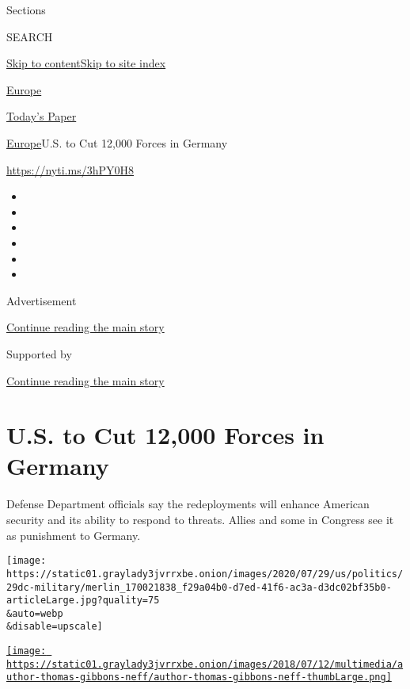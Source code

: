 Sections

SEARCH

\protect\hyperlink{site-content}{Skip to
content}\protect\hyperlink{site-index}{Skip to site index}

\href{https://www.nytimes3xbfgragh.onion/section/world/europe}{Europe}

\href{https://myaccount.nytimes3xbfgragh.onion/auth/login?response_type=cookie\&client_id=vi}{}

\href{https://www.nytimes3xbfgragh.onion/section/todayspaper}{Today's
Paper}

\href{/section/world/europe}{Europe}\textbar{}U.S. to Cut 12,000 Forces
in Germany

\url{https://nyti.ms/3hPY0H8}

\begin{itemize}
\item
\item
\item
\item
\item
\item
\end{itemize}

Advertisement

\protect\hyperlink{after-top}{Continue reading the main story}

Supported by

\protect\hyperlink{after-sponsor}{Continue reading the main story}

\hypertarget{us-to-cut-12000-forces-in-germany}{%
\section{U.S. to Cut 12,000 Forces in
Germany}\label{us-to-cut-12000-forces-in-germany}}

Defense Department officials say the redeployments will enhance American
security and its ability to respond to threats. Allies and some in
Congress see it as punishment to Germany.

\texttt{[image: https://static01.graylady3jvrrxbe.onion/images/2020/07/29/us/politics/29dc-military/merlin\_170021838\_f29a04b0-d7ed-41f6-ac3a-d3dc02bf35b0-articleLarge.jpg?quality=75\\\&auto=webp\\\&disable=upscale]}

\href{https://www.nytimes3xbfgragh.onion/by/thomas-gibbons-neff}{\texttt{[image: https://static01.graylady3jvrrxbe.onion/images/2018/07/12/multimedia/author-thomas-gibbons-neff/author-thomas-gibbons-neff-thumbLarge.png]}}

